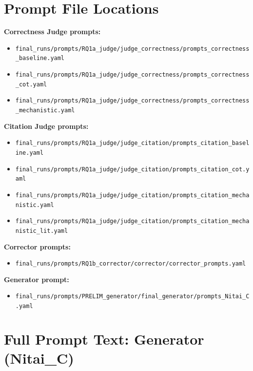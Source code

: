 \section{Prompt File Locations}
\label{sec:prompt_file_locations}
\noindent\textbf{Correctness Judge prompts:}
\begin{itemize}[noitemsep]
    \item \texttt{final\_runs/prompts/RQ1a\_judge/judge\_correctness/prompts\_correctness\_baseline.yaml}
    \item \texttt{final\_runs/prompts/RQ1a\_judge/judge\_correctness/prompts\_correctness\_cot.yaml}
    \item \texttt{final\_runs/prompts/RQ1a\_judge/judge\_correctness/prompts\_correctness\_mechanistic.yaml}
\end{itemize}

\noindent\textbf{Citation Judge prompts:}
\begin{itemize}[noitemsep]
    \item \texttt{final\_runs/prompts/RQ1a\_judge/judge\_citation/prompts\_citation\_baseline.yaml}
    \item \texttt{final\_runs/prompts/RQ1a\_judge/judge\_citation/prompts\_citation\_cot.yaml}
    \item \texttt{final\_runs/prompts/RQ1a\_judge/judge\_citation/prompts\_citation\_mechanistic.yaml}
    \item \texttt{final\_runs/prompts/RQ1a\_judge/judge\_citation/prompts\_citation\_mechanistic\_lit.yaml}
\end{itemize}

\noindent\textbf{Corrector prompts:}
\begin{itemize}[noitemsep]
    \item \texttt{final\_runs/prompts/RQ1b\_corrector/corrector/corrector\_prompts.yaml}
\end{itemize}

\noindent\textbf{Generator prompt:}
\begin{itemize}[noitemsep]
    \item \texttt{final\_runs/prompts/PRELIM\_generator/final\_generator/prompts\_Nitai\_C.yaml}
\end{itemize}
\label{sec:correctness_prompts}
\label{sec:citation_prompts}
\label{sec:corrector_prompts}

\section{Full Prompt Text: Generator (Nitai\_C)}
\label{sec:generator_prompt_text}

